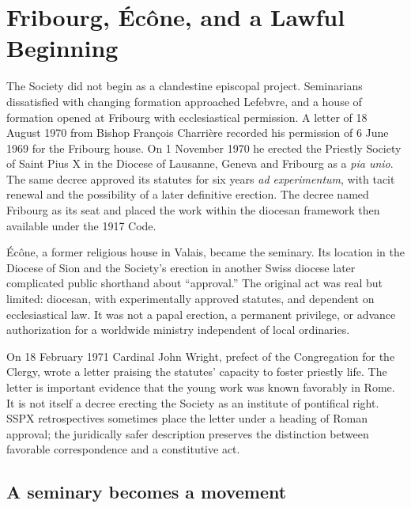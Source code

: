\section{Fribourg, Écône, and a Lawful Beginning}

The Society did not begin as a clandestine episcopal project. Seminarians dissatisfied with changing formation approached Lefebvre, and a house of formation opened at Fribourg with ecclesiastical permission. A letter of 18 August 1970 from Bishop François Charrière recorded his permission of 6 June 1969 for the Fribourg house. On 1 November 1970 he erected the Priestly Society of Saint Pius X in the Diocese of Lausanne, Geneva and Fribourg as a \emph{pia unio}. The same decree approved its statutes for six years \emph{ad experimentum}, with tacit renewal and the possibility of a later definitive erection. The decree named Fribourg as its seat and placed the work within the diocesan framework then available under the 1917 Code.

Écône, a former religious house in Valais, became the seminary. Its location in the Diocese of Sion and the Society's erection in another Swiss diocese later complicated public shorthand about ``approval.'' The original act was real but limited: diocesan, with experimentally approved statutes, and dependent on ecclesiastical law. It was not a papal erection, a permanent privilege, or advance authorization for a worldwide ministry independent of local ordinaries.

On 18 February 1971 Cardinal John Wright, prefect of the Congregation for the Clergy, wrote a letter praising the statutes' capacity to foster priestly life. The letter is important evidence that the young work was known favorably in Rome. It is not itself a decree erecting the Society as an institute of pontifical right. SSPX retrospectives sometimes place the letter under a heading of Roman approval; the juridically safer description preserves the distinction between favorable correspondence and a constitutive act.


\subsection{A seminary becomes a movement}

